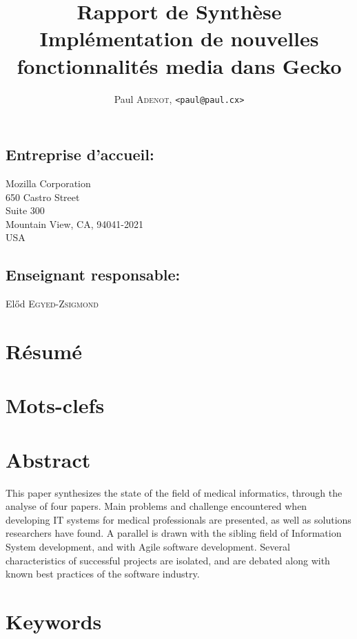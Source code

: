 \documentclass[a4paper,10pt]{article}
\title{\textsf{\textbf{Rapport de Synthèse\\Implémentation de nouvelles
fonctionnalités media dans Gecko}}}
\author{Paul \textsc{Adenot}, \texttt{<paul@paul.cx>}}
\date{}
\begin{document}
\maketitle
\begin{multicols}{2}
\subsection*{Entreprise d'accueil:}
\noindent
Mozilla Corporation\\
650 Castro Street\\
Suite 300\\
Mountain View, CA, 94041-2021\\
USA\\

\subsection*{Enseignant responsable:}
\noindent
Előd \textsc{Egyed-Zsigmond}

\section*{Résumé}


\section*{Mots-clefs}

\section*{Abstract}
This paper synthesizes the state of the field of medical informatics, through
the analyse of four papers. Main problems and challenge encountered when
developing IT systems for medical professionals are presented, as well as
solutions researchers have found. A parallel is drawn with the sibling field of
Information System development, and with Agile software development. Several
characteristics of successful projects are isolated, and are debated along with
known best practices of the software industry.

\section*{Keywords}

\columnbreak

{\footnotesize
\tableofcontents
}

\clearpage


\end{multicols}
\end{document}
